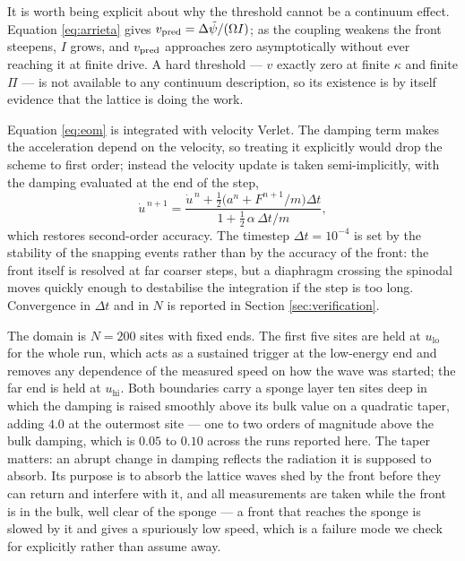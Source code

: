 It is worth being explicit about why the threshold cannot be a continuum effect.
Equation \eqref{eq:arrieta} gives $v_{\rm pred} = \Delta\tilde\psi/(\Omega I)$; as
the coupling weakens the front steepens, $I$ grows, and $v_{\rm pred}$ approaches zero
asymptotically without ever reaching it at finite drive. A hard threshold ---
$v$ exactly zero at finite $\kappa$ and finite $\Pi$ --- is not available to any
continuum description, so its existence is by itself evidence that the lattice is
doing the work.



Equation \eqref{eq:eom} is integrated with velocity Verlet. The damping term makes
the acceleration depend on the velocity, so treating it explicitly would drop the
scheme to first order; instead the velocity update is taken semi-implicitly, with
the damping evaluated at the end of the step,
%
\begin{equation}
  \dot u^{\,n+1} =
  \frac{\dot u^{\,n} + \tfrac12\big(a^n + F^{n+1}/m\big)\Delta t}
       {1 + \tfrac12\,\alpha\,\Delta t/m},
  \label{eq:semiimplicit}
\end{equation}
%
which restores second-order accuracy. The timestep $\Delta t = 10^{-4}$ is set by
the stability of the snapping events rather than by the accuracy of the front: the
front itself is resolved at far coarser steps, but a diaphragm crossing the
spinodal moves quickly enough to destabilise the integration if the step is too
long. Convergence in $\Delta t$ and in $N$ is reported in Section
\ref{sec:verification}.

The domain is $N = 200$ sites with fixed ends. The first five sites are held at
$u_{\text{lo}}$ for the whole run, which acts as a sustained trigger at the
low-energy end and removes any dependence of the measured speed on how the wave
was started; the far end is held at $u_{\text{hi}}$. Both boundaries carry a
sponge layer ten sites deep in which the damping is raised smoothly above its bulk
value on a quadratic taper, adding $4.0$ at the outermost site --- one to two
orders of magnitude above the bulk damping, which is $0.05$ to $0.10$ across the
runs reported here. The taper matters: an abrupt change in damping reflects the
radiation it is supposed to absorb. Its purpose is to absorb the lattice waves shed by the front
before they can return and interfere with it, and all measurements are taken while
the front is in the bulk, well clear of the sponge --- a front that reaches the
sponge is slowed by it and gives a spuriously low speed, which is a failure mode
we check for explicitly rather than assume away.

